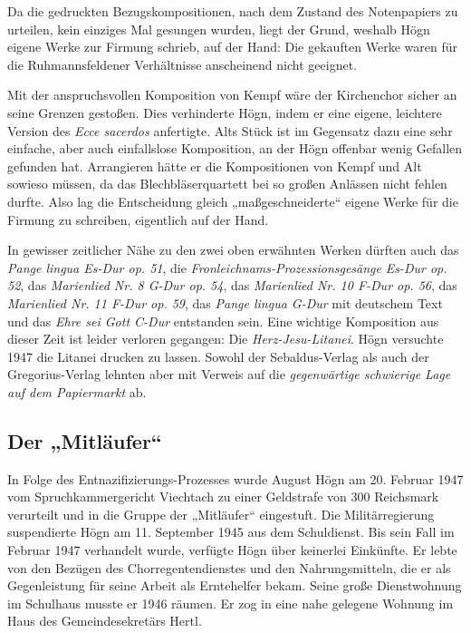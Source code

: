 \documentclass{book}
\begin{document}
Da die gedruckten Bezugskompositionen, nach dem Zustand des
Noten\-papiers zu urteilen, kein einziges Mal gesungen wurden, liegt
der Grund, wes\-halb Högn eigene Werke zur Firmung schrieb, auf der
Hand: Die gekauften Werke waren für die Ruhmannsfeldener Verhältnisse
anscheinend nicht ge\-eignet.

Mit der anspruchsvollen Komposition von Kempf wäre der Kirchenchor
sicher an seine Grenzen gestoßen. Dies verhinderte Högn, indem er eine
eigene, leichtere Version des \textit{Ecce sacerdos} anfertigte. Alts
Stück ist im Gegen\-satz dazu eine sehr einfache, aber auch
einfallslose Komposition, an der Högn offenbar wenig Gefallen gefunden
hat. Arrangieren hätte er die Kompo\-sitionen von Kempf und Alt sowieso
müssen, da das Blechbläserquartett bei so großen Anlässen nicht fehlen
durfte. Also lag die Entscheidung gleich „maßgeschneiderte“ eigene
Werke für die Firmung zu schreiben, eigentlich auf der Hand. 

In gewisser zeitlicher Nähe zu den zwei oben erwähnten Werken dürften
auch das \textit{Pange lingua Es-Dur op. 51}, die
\textit{Fronleichnams-Prozessionsgesänge} \textit{Es-Dur op. 52}, das
\textit{Marienlied Nr. 8 G-Dur op. 54}, das \textit{Marienlied Nr. 10
F-Dur op. 56}, das \textit{Marienlied Nr. 11 F-Dur op. 59}, das
\textit{Pange lingua G-Dur} mit deutschem Text und das \textit{Ehre sei
Gott C-Dur} entstanden sein. Eine wichtige Komposition aus dieser Zeit
ist leider verloren gegangen: Die \textit{Herz-Jesu-Litanei}. Högn
versuchte 1947 die Litanei drucken zu lassen. Sowohl der
Sebaldus-Verlag als auch der Gregorius-Verlag lehnten aber mit Verweis
auf die \textit{gegenwärtige schwierige Lage auf dem Papiermarkt }ab.

\subsection{Der „Mitläufer“}
In Folge des Entnazifizierungs-Prozesses wurde August Högn am 20.
Februar 1947 vom Spruchkammergericht Viechtach zu einer Geldstrafe von
300 Reichsmark verurteilt und in die Gruppe der „Mitläufer“ eingestuft.
Die Mili\-tärregierung suspendierte Högn am 11. September 1945 aus dem
Schuldienst. Bis sein Fall im Februar 1947 verhandelt wurde, verfügte
Högn über keinerlei Einkünfte. Er lebte von den Bezügen des
Chorregentendienstes und den Nahrungsmitteln, die er als Gegenleistung
für seine Arbeit als Erntehelfer bekam. Seine große Dienstwohnung im
Schulhaus musste er 1946 räumen. Er zog in eine nahe gelegene Wohnung
im Haus des Gemeindesekretärs Hertl.
\end{document}
